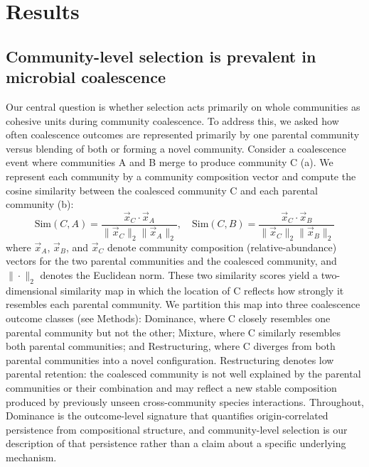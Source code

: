 \section{Results}
\label{sec:results}



\subsection{Community-level selection is prevalent in microbial coalescence}
\label{sec:results:dominance_prevalent}

Our central question is whether selection acts primarily on whole communities as cohesive units during community coalescence. To address this, we asked how often coalescence outcomes are represented primarily by one parental community versus blending of both or forming a novel community. Consider a coalescence event where communities A and B merge to produce community C (a). We represent each community by a community composition vector and compute the cosine similarity between the coalesced community C and each parental community (b):
\begin{equation}
\text{Sim}(C, A) = \frac{\vec{x}_C \cdot \vec{x}_A}{\|\vec{x}_C\|_2 \|\vec{x}_A\|_2}, \quad \text{Sim}(C, B) = \frac{\vec{x}_C \cdot \vec{x}_B}{\|\vec{x}_C\|_2 \|\vec{x}_B\|_2}
\label{eq:similarity}
\end{equation}
where $\vec{x}_A$, $\vec{x}_B$, and $\vec{x}_C$ denote community composition (relative-abundance) vectors for the two parental communities and the coalesced community, and $\|\cdot\|_2$ denotes the Euclidean norm. These two similarity scores yield a two-dimensional similarity map in which the location of C reflects how strongly it resembles each parental community. We partition this map into three coalescence outcome classes (see Methods): Dominance, where C closely resembles one parental community but not the other; Mixture, where C similarly resembles both parental communities; and Restructuring, where C diverges from both parental communities into a novel configuration. Restructuring denotes low parental retention: the coalesced community is not well explained by the parental communities or their combination and may reflect a new stable composition produced by previously unseen cross-community species interactions. Throughout, Dominance is the outcome-level signature that quantifies origin-correlated persistence from compositional structure, and community-level selection is our description of that persistence rather than a claim about a specific underlying mechanism.

